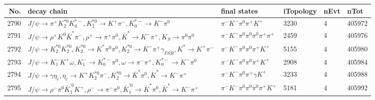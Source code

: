 \begin{table}[htbp] 
\begin{center}
\begin{small}
\begin{tabular}{rlllll}\hline\hline
 No. & decay chain & final states &  iTopology & nEvt & nTot \\\hline
2790&$J/\psi       \rightarrow \pi^{+}        K_2^{*0}       K_{0}^{*-}     , K_2^{*0}        \rightarrow K^{+}          \pi^{-}        , K_{0}^{*-}      \rightarrow K^{-}          \pi^{0}        $&$\pi^{-}        K^{-}          \pi^{0}        \pi^{+}        K^{+}          $& 3230&    4&405972\\
2791&$J/\psi       \rightarrow \rho^{+}      K^{0}          \bar{K}^{*}   \pi^{-}        , \rho^{+}       \rightarrow \pi^{+}        \pi^{0}        , \bar{K}^{*}    \rightarrow K^{-}          \pi^{+}        , K_{S}           \rightarrow \pi^{0}        \pi^{0}        $&$\pi^{-}        K^{-}          \pi^{0}        \pi^{0}        \pi^{0}        \pi^{+}        \pi^{+}        $& 2459&    4&405976\\
2792&$J/\psi       \rightarrow K_2^{*0}       K_2^{*0}       , K_2^{*0}        \rightarrow K^{*}          \pi^{0}        \pi^{0}        , K_2^{*0}        \rightarrow K^{-}          \pi^{+}        \gamma_{FSR} , K^{*}           \rightarrow K^{+}          \pi^{-}        $&$\pi^{-}        K^{-}          \pi^{0}        \pi^{0}        \pi^{+}        K^{+}          $& 5155&    4&405980\\
2793&$J/\psi       \rightarrow K_{1}^{-}      K^{+}          \omega         , K_{1}^{-}       \rightarrow K_{0}^{*-}     \pi^{0}        , \omega          \rightarrow \pi^{-}        \pi^{+}        , K_{0}^{*-}      \rightarrow K^{-}          \pi^{0}        $&$\pi^{-}        K^{-}          \pi^{0}        \pi^{0}        \pi^{+}        K^{+}          $& 2908&    4&405984\\
2794&$J/\psi       \rightarrow \gamma       \eta_{c}    , \eta_{c}     \rightarrow K^{+}          K_2^{*0}       \pi^{-}        , K_2^{*0}        \rightarrow \bar{K}^{*}   \pi^{0}        , \bar{K}^{*}    \rightarrow K^{-}          \pi^{+}        $&$\pi^{-}        K^{-}          \pi^{0}        \pi^{+}        \gamma       K^{+}          $& 3233&    4&405988\\
2795&$J/\psi       \rightarrow \rho^{-}      \pi^{0}        \bar{K}_1^{'0}K^{+}          , \rho^{-}       \rightarrow \pi^{-}        \pi^{0}        , \bar{K}_1^{'0} \rightarrow \bar{K}^{*}   \pi^{0}        , \bar{K}^{*}    \rightarrow K^{-}          \pi^{+}        $&$\pi^{-}        K^{-}          \pi^{0}        \pi^{0}        \pi^{0}        \pi^{+}        K^{+}          $& 5181&    4&405992\\

\end{tabular}
\end{small}
\end{center}
\end{table}
